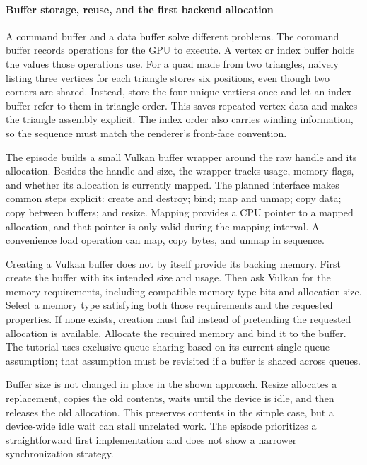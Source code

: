 \paragraph{Buffer storage, reuse, and the first backend allocation}\label{buffer-storage-reuse-and-the-first-backend-allocation}

A command buffer and a data buffer solve different problems. The command buffer records operations for the GPU to execute. A vertex or index buffer holds the values those operations use. For a quad made from two triangles, naively listing three vertices for each triangle stores six positions, even though two corners are shared. Instead, store the four unique vertices once and let an index buffer refer to them in triangle order. This saves repeated vertex data and makes the triangle assembly explicit. The index order also carries winding information, so the sequence must match the renderer's front-face convention.

The episode builds a small Vulkan buffer wrapper around the raw handle and its allocation. Besides the handle and size, the wrapper tracks usage, memory flags, and whether its allocation is currently mapped. The planned interface makes common steps explicit: create and destroy; bind; map and unmap; copy data; copy between buffers; and resize. Mapping provides a CPU pointer to a mapped allocation, and that pointer is only valid during the mapping interval. A convenience load operation can map, copy bytes, and unmap in sequence.

Creating a Vulkan buffer does not by itself provide its backing memory. First create the buffer with its intended size and usage. Then ask Vulkan for the memory requirements, including compatible memory-type bits and allocation size. Select a memory type satisfying both those requirements and the requested properties. If none exists, creation must fail instead of pretending the requested allocation is available. Allocate the required memory and bind it to the buffer. The tutorial uses exclusive queue sharing based on its current single-queue assumption; that assumption must be revisited if a buffer is shared across queues.

Buffer size is not changed in place in the shown approach. Resize allocates a replacement, copies the old contents, waits until the device is idle, and then releases the old allocation. This preserves contents in the simple case, but a device-wide idle wait can stall unrelated work. The episode prioritizes a straightforward first implementation and does not show a narrower synchronization strategy.

